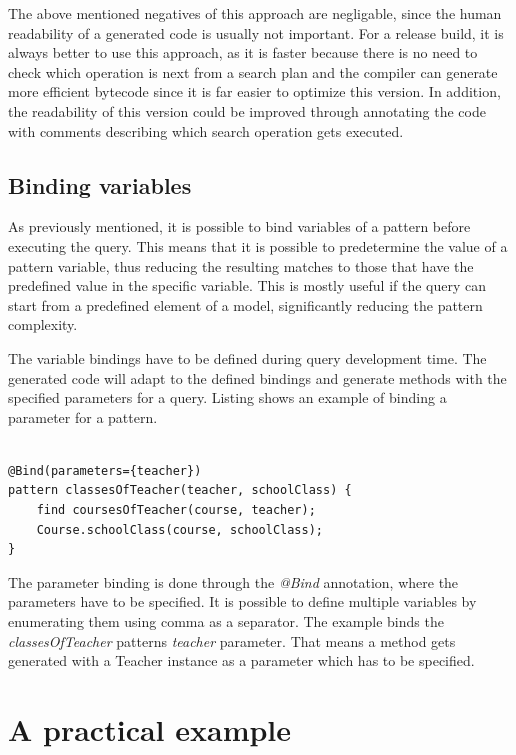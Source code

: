 The above mentioned negatives of this approach are negligable, since the human
readability of a generated code is usually not important. For a release build,
it is always better to use this approach, as it is faster because there is no
need to check which operation is next from a search plan and the compiler can
generate more efficient bytecode since it is far easier to optimize this
version. In addition, the readability of this version could be improved through
annotating the code with comments describing which search operation gets
executed.

\subsection{Binding variables}\label{sect:binding_variables}

As previously mentioned, it is possible to bind variables of a pattern before
executing the query. This means that it is possible to predetermine the value of
a pattern variable, thus reducing the resulting matches to those that have the
predefined value in the specific variable. This is mostly useful if the query
can start from a predefined element of a model, significantly reducing the
pattern complexity.

The variable bindings have to be defined during query development time. The
generated code will adapt to the defined bindings and generate methods with the
specified parameters for a query. Listing  shows an
example of binding a parameter for a pattern.

\begin{lstlisting}[frame=single,float=!ht,language=IQPL,
label=listing:pattern_binding, caption=Binding of a parameter]

@Bind(parameters={teacher})
pattern classesOfTeacher(teacher, schoolClass) {
	find coursesOfTeacher(course, teacher);
	Course.schoolClass(course, schoolClass);
}

\end{lstlisting}

The parameter binding is done through the \emph{@Bind} annotation, where the
parameters have to be specified. It is possible to define multiple variables by
enumerating them using comma as a separator. The example binds the
\emph{classesOfTeacher} patterns \emph{teacher} parameter. That means a method
gets generated with a Teacher instance as a parameter which has to be specified.

\section{A practical example}

